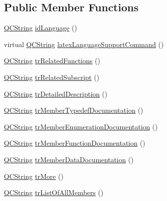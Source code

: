 \subsection*{Public Member Functions}
\begin{DoxyCompactItemize}
\item 
\mbox{\hyperlink{class_q_c_string}{Q\+C\+String}} \mbox{\hyperlink{class_translator_portuguese_abc1436faf18f09df7579a53e537fc56a}{id\+Language}} ()
\item 
virtual \mbox{\hyperlink{class_q_c_string}{Q\+C\+String}} \mbox{\hyperlink{class_translator_portuguese_a1396ca92359aa49347ab1ac381acebb3}{latex\+Language\+Support\+Command}} ()
\item 
\mbox{\hyperlink{class_q_c_string}{Q\+C\+String}} \mbox{\hyperlink{class_translator_portuguese_aa602d4780f162f3f07d20f7e4cbeea5f}{tr\+Related\+Functions}} ()
\item 
\mbox{\hyperlink{class_q_c_string}{Q\+C\+String}} \mbox{\hyperlink{class_translator_portuguese_a6aea8d18283e8182a67726fccd68b744}{tr\+Related\+Subscript}} ()
\item 
\mbox{\hyperlink{class_q_c_string}{Q\+C\+String}} \mbox{\hyperlink{class_translator_portuguese_a2dae00e057abe35b7803d9e7c48e8c5c}{tr\+Detailed\+Description}} ()
\item 
\mbox{\hyperlink{class_q_c_string}{Q\+C\+String}} \mbox{\hyperlink{class_translator_portuguese_a1ef77336f6841771f0782fd7de33c391}{tr\+Member\+Typedef\+Documentation}} ()
\item 
\mbox{\hyperlink{class_q_c_string}{Q\+C\+String}} \mbox{\hyperlink{class_translator_portuguese_aed1576e1ad9622e1a79e0d9250b9039e}{tr\+Member\+Enumeration\+Documentation}} ()
\item 
\mbox{\hyperlink{class_q_c_string}{Q\+C\+String}} \mbox{\hyperlink{class_translator_portuguese_a763aeb9393a316c2ef69b13d969e59f1}{tr\+Member\+Function\+Documentation}} ()
\item 
\mbox{\hyperlink{class_q_c_string}{Q\+C\+String}} \mbox{\hyperlink{class_translator_portuguese_a0d6b063892d35726748f79e8a669e7d6}{tr\+Member\+Data\+Documentation}} ()
\item 
\mbox{\hyperlink{class_q_c_string}{Q\+C\+String}} \mbox{\hyperlink{class_translator_portuguese_ac5f0e7715631eb9c7b02d7c2114c4a37}{tr\+More}} ()
\item 
\mbox{\hyperlink{class_q_c_string}{Q\+C\+String}} \mbox{\hyperlink{class_translator_portuguese_ab515ef96060b58670c6366af6a43a8f4}{tr\+List\+Of\+All\+Members}} ()
\item 

\end{DoxyCompactItemize}
